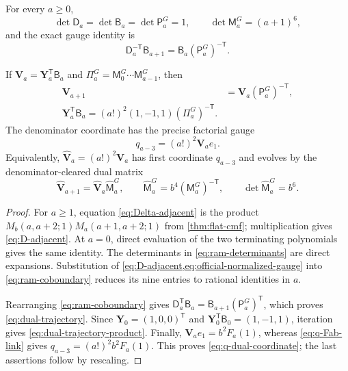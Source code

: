 \begin{theorem}
\label{thm:ram-gauge}
For every \(a\ge0\),
\begin{equation}\label{eq:ram-determinants}
 \det\mathsf D_a=\det\mathsf B_a=\det\mathsf P_a^G=1,
 \qquad \det\mathsf M_a^G=(a+1)^6,
\end{equation}
and the exact gauge identity is
\begin{equation}\label{eq:ram-coboundary}
 \boxed{\displaystyle
 \mathsf D_a^{-\mathsf T}\mathsf B_{a+1}
 =\mathsf B_a(\mathsf P_a^G)^{-\mathsf T}.}
\end{equation}

If \(\mathbf V_a=\mathbf Y_a^{\mathsf T}\mathsf B_a\) and
\(\Pi_a^G=\mathsf M_0^G\cdots\mathsf M_{a-1}^G\), then
\begin{align}
 \mathbf V_{a+1}&=\mathbf V_a(\mathsf P_a^G)^{-\mathsf T},
 \label{eq:dual-trajectory}\\
 \boxed{\displaystyle
 \mathbf Y_a^{\mathsf T}\mathsf B_a
 =(a!)^2(1,-1,1)(\Pi_a^G)^{-\mathsf T}.}
 \label{eq:dual-trajectory-product}
\end{align}
The denominator coordinate has the precise factorial gauge
\begin{equation}\label{eq:q-dual-coordinate}
 \boxed{\displaystyle
 q_{a-3}=(a!)^2\mathbf V_ae_1.}
\end{equation}
Equivalently, \(\widehat{\mathbf V}_a=(a!)^2\mathbf V_a\) has first
coordinate \(q_{a-3}\) and evolves by the denominator-cleared dual matrix
\begin{equation}\label{eq:denominator-cleared-dual}
 \widehat{\mathbf V}_{a+1}
 =\widehat{\mathbf V}_a\widehat{\mathsf M}_a^G,\qquad
 \widehat{\mathsf M}_a^G=b^4(\mathsf M_a^G)^{-\mathsf T},\qquad
 \det\widehat{\mathsf M}_a^G=b^6.
\end{equation}
\end{theorem}

\begin{proof}
For \(a\ge1\), equation \eqref{eq:Delta-adjacent} is the product
\(M_b(a,a+2;1)M_a(a+1,a+2;1)\) from
\cref{thm:flat-cmf}; multiplication gives \eqref{eq:D-adjacent}.  At
\(a=0\), direct evaluation of the two terminating polynomials gives the
same identity.
The determinants in \eqref{eq:ram-determinants} are direct expansions.
Substitution of \cref{eq:D-adjacent,eq:official-normalized-gauge} into
\eqref{eq:ram-coboundary} reduces its nine entries to rational identities in
\(a\).

Rearranging \eqref{eq:ram-coboundary} gives
\(\mathsf D_a^{\mathsf T}\mathsf B_a
=\mathsf B_{a+1}(\mathsf P_a^G)^{\mathsf T}\), which proves
\eqref{eq:dual-trajectory}.  Since
\(\mathbf Y_0=(1,0,0)^{\mathsf T}\) and
\(\mathbf Y_0^{\mathsf T}\mathsf B_0=(1,-1,1)\), iteration gives
\eqref{eq:dual-trajectory-product}.  Finally,
\(\mathbf V_ae_1=b^2F_a(1)\), whereas
\eqref{eq:q-Fab-link} gives
\(q_{a-3}=(a!)^2b^2F_a(1)\).  This proves
\eqref{eq:q-dual-coordinate}; the last assertions follow by rescaling.
\end{proof}

